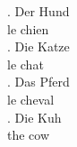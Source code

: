 

\ex. \gll Der Hund \\ le chien \\

\ex. 
\gll Die Katze \\ le chat \\

\ex. \gll Das Pferd \\ le cheval \\

\ex. \gll Die Kuh \\ the cow \\


